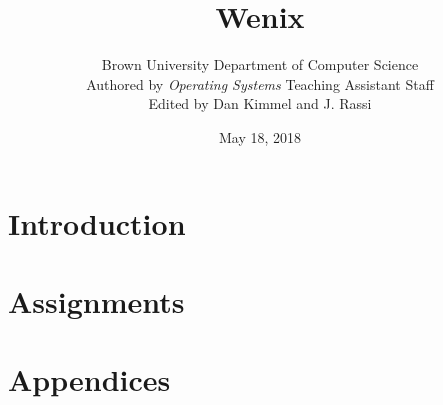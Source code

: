 \documentclass{book}
\title{\bf Wenix}
\author{Brown University Department of Computer Science \\ Authored by \textit{Operating Systems} Teaching Assistant Staff \\ Edited by Dan Kimmel and J. Rassi}
\begin{document}
    \date{May 18, 2018}
    \maketitle
    \tableofcontents
	\part{Introduction}
        
        
    \part{Assignments}
        
        
        
        
        
    \part{Appendices}
        \appendix
        
        
        
\end{document}
